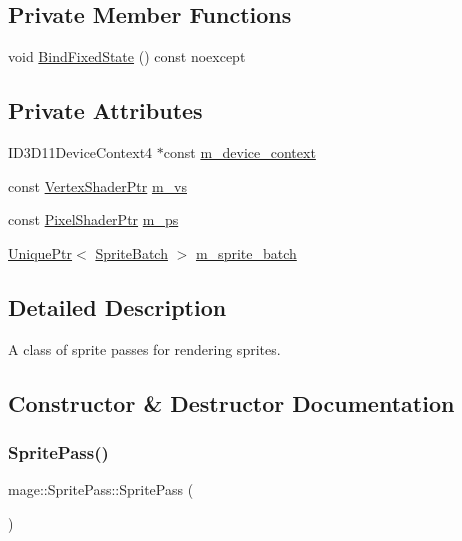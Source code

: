 \subsection*{Private Member Functions}
\begin{DoxyCompactItemize}
\item 
void \hyperlink{classmage_1_1_sprite_pass_accdad82309711cb5248d61de1a85c8d1}{Bind\+Fixed\+State} () const noexcept
\end{DoxyCompactItemize}
\subsection*{Private Attributes}
\begin{DoxyCompactItemize}
\item 
I\+D3\+D11\+Device\+Context4 $\ast$const \hyperlink{classmage_1_1_sprite_pass_aee6b9924a954629c19385c70ecf91d0a}{m\+\_\+device\+\_\+context}
\item 
const \hyperlink{namespacemage_a1f19b094f771e30bc0a6c1cebcc0dd58}{Vertex\+Shader\+Ptr} \hyperlink{classmage_1_1_sprite_pass_a9d84382cfebfea3195ef6cb8ca88d886}{m\+\_\+vs}
\item 
const \hyperlink{namespacemage_acbec875bb5e5e085e32ed244a24d2b6f}{Pixel\+Shader\+Ptr} \hyperlink{classmage_1_1_sprite_pass_ac9161d187ea23dd5f8c2ec5de34a6c0b}{m\+\_\+ps}
\item 
\hyperlink{namespacemage_a3316d7143a973e37adf1110f2e80ca31}{Unique\+Ptr}$<$ \hyperlink{classmage_1_1_sprite_batch}{Sprite\+Batch} $>$ \hyperlink{classmage_1_1_sprite_pass_a9083152ae0681429df4dd0fce533f7dc}{m\+\_\+sprite\+\_\+batch}
\end{DoxyCompactItemize}


\subsection{Detailed Description}
A class of sprite passes for rendering sprites. 

\subsection{Constructor \& Destructor Documentation}
\hypertarget{classmage_1_1_sprite_pass_abe484eb7c99dabc585d874029c85013f}{}\label{classmage_1_1_sprite_pass_abe484eb7c99dabc585d874029c85013f} 
\subsubsection{\texorpdfstring{Sprite\+Pass()}{SpritePass()}\hspace{0.1cm}{\footnotesize\ttfamily [1/3]}}
{\footnotesize\ttfamily mage\+::\+Sprite\+Pass\+::\+Sprite\+Pass (\begin{DoxyParamCaption}{ }\end{DoxyParamCaption})}

